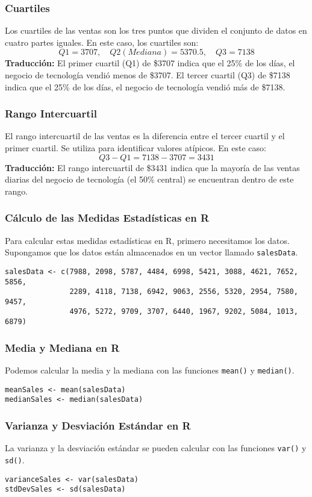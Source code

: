 \documentclass[aspectratio=169]{beamer}
\begin{document}
\begin{frame}
\frametitle{Cuartiles}
Los cuartiles de las ventas son los tres puntos que dividen el conjunto de datos en cuatro partes iguales. En este caso, los cuartiles son:
\[
Q1 = 3707, \quad Q2 (Mediana) = 5370.5, \quad Q3 = 7138
\]
\vfill \textbf{Traducción:} El primer cuartil (Q1) de \$3707 indica que el 25\% de los días, el negocio de tecnología vendió menos de \$3707. El tercer cuartil (Q3) de \$7138 indica que el 25\% de los días, el negocio de tecnología vendió más de \$7138.
\end{frame}

\begin{frame}
\frametitle{Rango Intercuartil}
El rango intercuartil de las ventas es la diferencia entre el tercer cuartil y el primer cuartil. Se utiliza para identificar valores atípicos. En este caso:
\[
Q3 - Q1 = 7138 - 3707 = 3431
\]
\vfill \textbf{Traducción:} El rango intercuartil de \$3431 indica que la mayoría de las ventas diarias del negocio de tecnología (el 50\% central) se encuentran dentro de este rango.
\end{frame}




\begin{frame}[fragile]
\frametitle{Cálculo de las Medidas Estadísticas en R}
Para calcular estas medidas estadísticas en R, primero necesitamos los datos. Supongamos que los datos están almacenados en un vector llamado \texttt{salesData}.

\begin{verbatim}
salesData <- c(7988, 2098, 5787, 4484, 6998, 5421, 3088, 4621, 7652, 5856, 
               2289, 4118, 7138, 6942, 9063, 2556, 5320, 2954, 7580, 9457, 
               4976, 5272, 9709, 3707, 6440, 1967, 9202, 5084, 1013, 6879)
\end{verbatim}
\end{frame}

\begin{frame}[fragile]
\frametitle{Media y Mediana en R}
Podemos calcular la media y la mediana con las funciones \texttt{mean()} y \texttt{median()}.

\begin{verbatim}
meanSales <- mean(salesData)
medianSales <- median(salesData)
\end{verbatim}
\end{frame}

\begin{frame}[fragile]
\frametitle{Varianza y Desviación Estándar en R}
La varianza y la desviación estándar se pueden calcular con las funciones \texttt{var()} y \texttt{sd()}.

\begin{verbatim}
varianceSales <- var(salesData)
stdDevSales <- sd(salesData)
\end{verbatim}
\end{frame}
\end{document}
